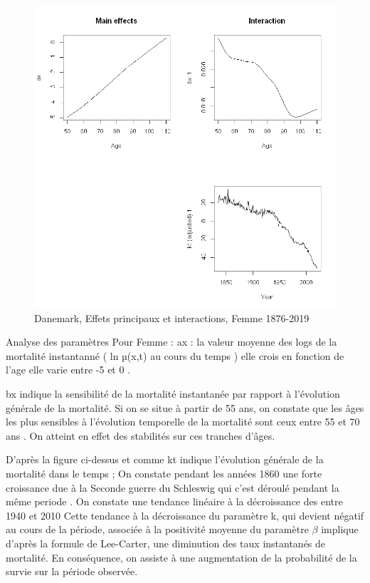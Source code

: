 \begin{figure}[!htb]
 \caption{Danemark, Effets principaux et interactions, Femme 1876-2019}
    \centering
    \includegraphics[scale =0.8]{output_7_5.png}
\end{figure}

Analyse des paramètres Pour Femme : ax : la valeur moyenne des logs de la mortalité instantanné ( ln µ(x,t) au cours du temps ) elle crois en fonction de l’age elle varie entre -5 et 0 .

bx indique la sensibilité de la mortalité instantanée par rapport à l’évolution générale de la mortalité. Si on se situe à partir de 55 ans, on constate que les âges les plus sensibles à l’évolution temporelle de la mortalité sont ceux entre 55 et 70 ans . On atteint en effet des stabilités sur ces tranches d’âges.

D’après la figure ci-dessus et comme kt indique l’évolution générale de la mortalité dans le temps ; On constate pendant les années 1860 une forte croissance due à la Seconde guerre du Schleswig qui c'est déroulé pendant la même periode . On constate une tendance linéaire à la décroissance des entre 1940 et 2010 Cette tendance à la décroissance du paramètre k, qui devient négatif au cours de la période, associée à la positivité moyenne du paramètre $\beta$ implique d’après la formule de Lee-Carter, une diminution des taux instantanés de mortalité. En conséquence, on assiste à une augmentation de la probabilité de la survie sur la période observée.

